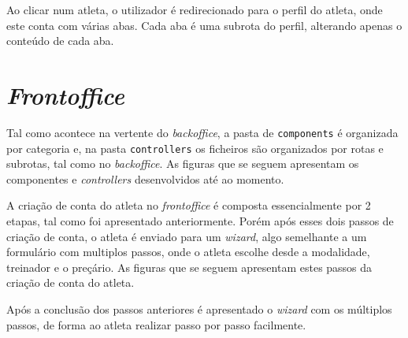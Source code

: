 Ao clicar num atleta, o utilizador é redirecionado para o perfil do atleta, onde este conta com várias abas. Cada aba é uma subrota do perfil, alterando apenas o conteúdo de cada aba.


\section{\textit{Frontoffice}}

Tal como acontece na vertente do \textit{backoffice}, a pasta de \texttt{components} é organizada por categoria e, na pasta \texttt{controllers} os ficheiros são organizados por rotas e subrotas, tal como no \textit{backoffice}. As figuras que se seguem apresentam os componentes e \textit{controllers} desenvolvidos até ao momento.

\begin{minipage}[t]{0.45\textwidth}
\end{minipage}
\begin{minipage}[t]{0.45\textwidth}
\end{minipage}

A criação de conta do atleta no \textit{frontoffice} é composta essencialmente por 2 etapas, tal como foi apresentado anteriormente. Porém após esses dois passos de criação de conta, o atleta é enviado para um \textit{wizard}, algo semelhante a um formulário com multiplos passos, onde o atleta escolhe desde a modalidade, treinador e o preçário. As figuras que se seguem apresentam estes passos da criação de conta do atleta.

\begin{minipage}[t]{0.45\textwidth}
\end{minipage}
\begin{minipage}[t]{0.45\textwidth}
\end{minipage}

Após a conclusão dos passos anteriores é apresentado o \textit{wizard} com os múltiplos passos, de forma ao atleta realizar passo por passo facilmente.

